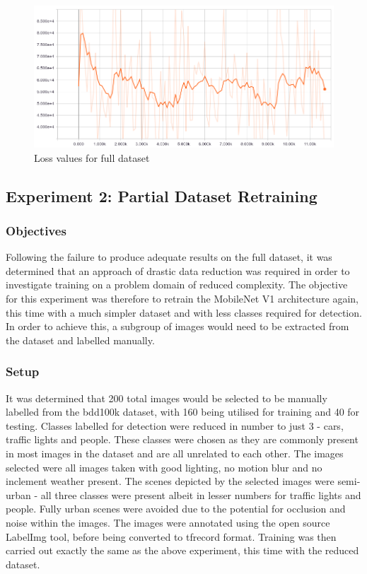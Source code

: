 \documentclass[12pt]{report}
\begin{document}
\vspace{0.5cm}
\begin{figure}[ht!]
	\centering
	\includegraphics[width=12cm]{mobilenet-full-dataset-loss}
	\caption{Loss values for full dataset}
	\label{fig:mobilenet-full-dataset-loss}
\end{figure}

\newpage
\subsection{Experiment 2: Partial Dataset Retraining}
\subsubsection{Objectives}
\begin{flushleft}
Following the failure to produce adequate results on the full dataset, it was determined that an approach of drastic data reduction was required in order to investigate training on a problem domain of reduced complexity. The objective for this experiment was therefore to retrain the MobileNet V1 architecture again, this time with a much simpler dataset and with less classes required for detection. In order to achieve this, a subgroup of images would need to be extracted from the dataset and labelled manually.
\end{flushleft}

\subsubsection{Setup}
\begin{flushleft}
It was determined that 200 total images would be selected to be manually labelled from the bdd100k dataset, with 160 being utilised for training and 40 for testing. Classes labelled for detection were reduced in number to just 3 - cars, traffic lights and people. These classes were chosen as they are commonly present in most images in the dataset and are all unrelated to each other. The images selected were all images taken with good lighting, no motion blur and no inclement weather present. The scenes depicted by the selected images were semi-urban - all three classes were present albeit in lesser numbers for traffic lights and people. Fully urban scenes were avoided due to the potential for occlusion and noise within the images. The images were annotated using the open source LabelImg tool, before being converted to tfrecord format. Training was then carried out exactly the same as the above experiment, this time with the reduced dataset.
\end{flushleft}
\end{document}
